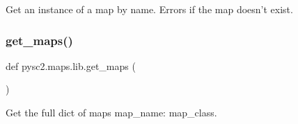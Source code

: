 \begin{DoxyVerb}Get an instance of a map by name. Errors if the map doesn't exist.\end{DoxyVerb}
 \mbox{\label{namespacepysc2_1_1maps_1_1lib_a60ff5f8b1af2571cee78b513d0b797eb}} 
\subsubsection{\texorpdfstring{get\+\_\+maps()}{get\_maps()}}
{\footnotesize\ttfamily def pysc2.\+maps.\+lib.\+get\+\_\+maps (\begin{DoxyParamCaption}{ }\end{DoxyParamCaption})}

\begin{DoxyVerb}Get the full dict of maps {map_name: map_class}.\end{DoxyVerb}
 